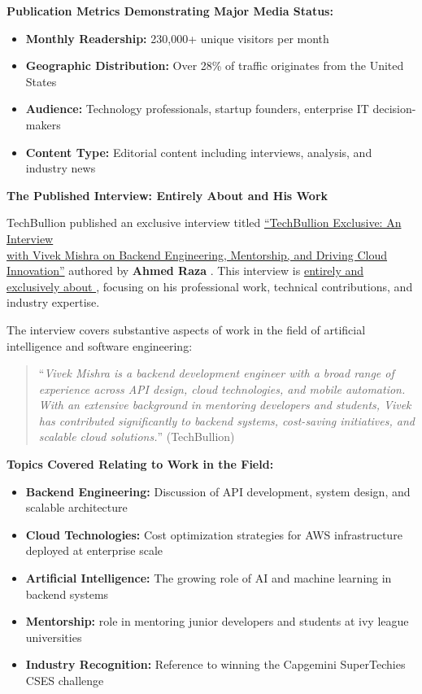 \textbf{Publication Metrics Demonstrating Major Media Status:}
\begin{itemize}
    \item \textbf{Monthly Readership:} 230,000+ unique visitors per month
    \item \textbf{Geographic Distribution:} Over 28\% of traffic originates from the United States
    \item \textbf{Audience:} Technology professionals, startup founders, enterprise IT decision-makers
    \item \textbf{Content Type:} Editorial content including interviews, analysis, and industry news
\end{itemize}

\textbf{The Published Interview: Entirely About \dr and His Work}

TechBullion published an exclusive interview titled \underline{``TechBullion Exclusive: An Interview}\\ \underline{with Vivek Mishra on Backend Engineering, Mentorship, and Driving Cloud Innovation''} authored by \textbf{Ahmed Raza} \cite{PM1}. This interview is \underline{entirely and exclusively about \dr}, focusing on his professional work, technical contributions, and industry expertise.

The interview covers substantive aspects of \drs work in the field of artificial intelligence and software engineering:

\begin{quote}
``\textit{Vivek Mishra is a backend development engineer with a broad range of experience across API design, cloud technologies, and mobile automation. With an extensive background in mentoring developers and students, Vivek has contributed significantly to backend systems, cost-saving initiatives, and scalable cloud solutions.}'' (TechBullion)
\end{quote}

\textbf{Topics Covered Relating to \drs Work in the Field:}
\begin{itemize}
    \item \textbf{Backend Engineering:} Discussion of API development, system design, and scalable architecture
    \item \textbf{Cloud Technologies:} Cost optimization strategies for AWS infrastructure deployed at enterprise scale
    \item \textbf{Artificial Intelligence:} The growing role of AI and machine learning in backend systems
    \item \textbf{Mentorship:} \drs role in mentoring junior developers and students at ivy league universities
    \item \textbf{Industry Recognition:} Reference to winning the Capgemini SuperTechies CSES challenge
\end{itemize}

